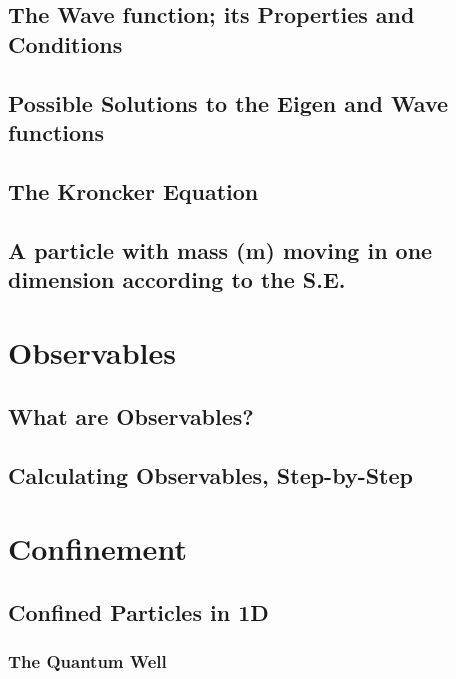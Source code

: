 \documentclass[colorlinks,11pt,a4paper,normalphoto,withhyper,ragged2e]{altareport}
\begin{document}
	
	\subsection{The Wave function; its Properties and Conditions}
	
	
	\subsection{Possible Solutions to the Eigen and Wave functions}
	
	
	\subsection{The Kroncker Equation}
	
	
	\subsection{A particle with mass (m) moving in one dimension according to the S.E.}
	
	
	\pagebreak
	
	
	
	
\section{Observables}
	
	\subsection{What are Observables?}
	
	
	\subsection{Calculating Observables, Step-by-Step}
	
	
	\pagebreak
	
	
	
	
\section{Confinement}
	
	\subsection{Confined Particles in 1D}
		
		\subsubsection{The Quantum Well}
		
\end{document}
